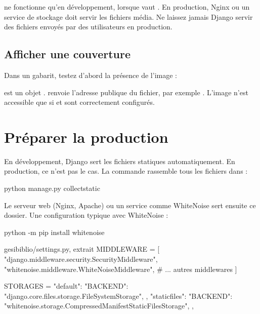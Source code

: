 \begin{attention}
 ne fonctionne qu'en développement, lorsque  vaut
. En production, Nginx ou un service de stockage doit servir les
fichiers média. Ne laissez jamais Django servir des fichiers envoyés par des
utilisateurs en production.
\end{attention}

\subsection{Afficher une couverture}

Dans un gabarit, testez d'abord la présence de l'image :


\begin{note}
 est un objet .  renvoie
l'adresse publique du fichier, par exemple .
L'image n'est accessible que si  et  sont
correctement configurés.
\end{note}

\section{Préparer la production}

En développement, Django sert les fichiers statiques automatiquement. En
production, ce n'est pas le cas. La commande  rassemble tous
les fichiers dans  :

\begin{terminal}
python manage.py collectstatic
\end{terminal}

Le serveur web (Nginx, Apache) ou un service comme WhiteNoise sert ensuite ce
dossier. Une configuration typique avec WhiteNoise :

\begin{terminal}
python -m pip install whitenoise
\end{terminal}

\begin{codebox}[python]{gesibiblio/settings.py, extrait}
MIDDLEWARE = [
    "django.middleware.security.SecurityMiddleware",
    "whitenoise.middleware.WhiteNoiseMiddleware",
    # ... autres middlewares
]

STORAGES = {
    "default": {
        "BACKEND": "django.core.files.storage.FileSystemStorage",
    },
    "staticfiles": {
        "BACKEND": "whitenoise.storage.CompressedManifestStaticFilesStorage",
    },
}
\end{codebox}

